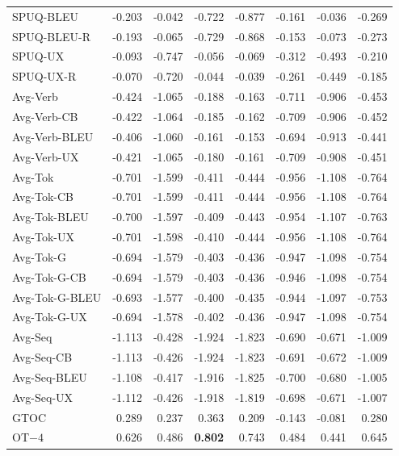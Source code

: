 {\begin{longtable}{@{}lrrrrrrr@{}}
SPUQ-BLEU & -0.203 & -0.042 & -0.722 & -0.877 & -0.161 & -0.036 & -0.269 \\
SPUQ-BLEU-R & -0.193 & -0.065 & -0.729 & -0.868 & -0.153 & -0.073 & -0.273 \\
SPUQ-UX & -0.093 & -0.747 & -0.056 & -0.069 & -0.312 & -0.493 & -0.210 \\
SPUQ-UX-R & -0.070 & -0.720 & -0.044 & -0.039 & -0.261 & -0.449 & -0.185 \\
\addlinespace
Avg-Verb & -0.424 & -1.065 & -0.188 & -0.163 & -0.711 & -0.906 & -0.453 \\
Avg-Verb-CB & -0.422 & -1.064 & -0.185 & -0.162 & -0.709 & -0.906 & -0.452 \\
Avg-Verb-BLEU & -0.406 & -1.060 & -0.161 & -0.153 & -0.694 & -0.913 & -0.441 \\
Avg-Verb-UX & -0.421 & -1.065 & -0.180 & -0.161 & -0.709 & -0.908 & -0.451 \\
\addlinespace
Avg-Tok & -0.701 & -1.599 & -0.411 & -0.444 & -0.956 & -1.108 & -0.764 \\
Avg-Tok-CB & -0.701 & -1.599 & -0.411 & -0.444 & -0.956 & -1.108 & -0.764 \\
Avg-Tok-BLEU & -0.700 & -1.597 & -0.409 & -0.443 & -0.954 & -1.107 & -0.763 \\
Avg-Tok-UX & -0.701 & -1.598 & -0.410 & -0.444 & -0.956 & -1.108 & -0.764 \\
Avg-Tok-G & -0.694 & -1.579 & -0.403 & -0.436 & -0.947 & -1.098 & -0.754 \\
Avg-Tok-G-CB & -0.694 & -1.579 & -0.403 & -0.436 & -0.946 & -1.098 & -0.754 \\
Avg-Tok-G-BLEU & -0.693 & -1.577 & -0.400 & -0.435 & -0.944 & -1.097 & -0.753 \\
Avg-Tok-G-UX & -0.694 & -1.578 & -0.402 & -0.436 & -0.947 & -1.098 & -0.754 \\
\addlinespace
Avg-Seq & -1.113 & -0.428 & -1.924 & -1.823 & -0.690 & -0.671 & -1.009 \\
Avg-Seq-CB & -1.113 & -0.426 & -1.924 & -1.823 & -0.691 & -0.672 & -1.009 \\
Avg-Seq-BLEU & -1.108 & -0.417 & -1.916 & -1.825 & -0.700 & -0.680 & -1.005 \\
Avg-Seq-UX & -1.112 & -0.426 & -1.918 & -1.819 & -0.698 & -0.671 & -1.007 \\
\addlinespace
GTOC & \phantom{-}0.289 & \phantom{-}0.237 & \phantom{-}0.363 & \phantom{-}0.209 & -0.143 & -0.081 & \phantom{-}0.280 \\
\addlinespace
OT$-4$ & \phantom{-}0.626 & \phantom{-}0.486 & \textbf{\phantom{-}0.802} & \phantom{-}0.743 & \phantom{-}0.484 & \phantom{-}0.441 & \phantom{-}0.645 \\

\end{longtable}}
